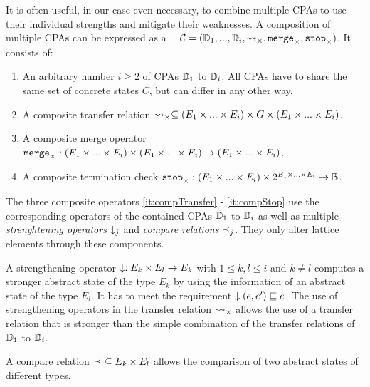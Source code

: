 \subsubsection{\CompositeCPA}
It is often useful, in our case even necessary, to combine multiple CPAs to use their individual strengths and mitigate their weaknesses.
A composition of multiple CPAs can be expressed as a \compositeCPA\ \cite{BeyerBook}\ $\mathcal{C} = (\mathbb{D}_1, ..., \mathbb{D}_i, \rightsquigarrow_\times, \texttt{merge}_\times, \texttt{stop}_\times)$.
It consists of:
\begin{enumerate}[leftmargin=*, label=\arabic*.]

\item An arbitrary number $i \geq 2$ of CPAs $\mathbb{D}_1$ to $\mathbb{D}_i$. All CPAs have to share the same set of concrete states $C$, but can differ in any other way.
\item \label{it:compTransfer} A composite transfer relation $\rightsquigarrow_\times \subseteq (E_1 \times ... \times E_i) \times G \times (E_1 \times ... \times E_i)$.
\item \label{it:compMerge} A composite merge operator $\texttt{merge}_\times : (E_1 \times ... \times E_i) \times (E_1 \times ... \times E_i) \rightarrow (E_1 \times ... \times E_i)$.
\item \label{it:compStop} A composite termination check $\texttt{stop}_\times : (E_1 \times ... \times E_i) \times 2^{E_1 \times ... \times E_i} \rightarrow \mathbb{B}$.
\end{enumerate}
The three composite operators \ref{it:compTransfer} - \ref{it:compStop} use the corresponding operators of the contained CPAs $\mathbb{D}_1$ to $\mathbb{D}_i$ as well as multiple \emph{strenghtening operators} $\downarrow_j$ and \emph{compare relations} $\preceq_j$. They only alter lattice elements through these components.

A strengthening operator $\downarrow : E_k \times E_l \rightarrow E_k$ with $1 \leq k, l \leq i$ and $k \neq l$ computes a stronger abstract state of the type $E_k$ by using the information of an abstract state of the type $E_l$. It has to meet the requirement $\downarrow(e, e') \sqsubseteq e$.
The use of strengthening operators in the transfer relation $\rightsquigarrow_\times$ allows the use of a transfer relation that is stronger than the simple combination of the transfer relations of $\mathbb{D}_1$ to $\mathbb{D}_i$.

A compare relation $\preceq\ \subseteq E_k \times E_l$ allows the comparison of two abstract states of different types.

